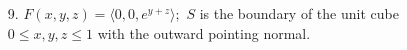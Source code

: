 \documentclass[11 pt]{report}
\begin{document}
\begin{enumerate}
\item[9.] $F(x,y,z) = \langle 0, 0, e^{y+z} \rangle;$ $S$ is the boundary of the unit cube $0 \leq x,y,z \leq 1$ with the outward pointing normal. 

%
%
%
%
%
%
\end{enumerate}
\end{document}
